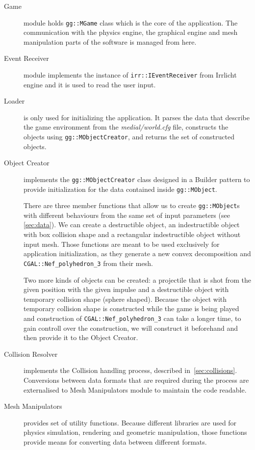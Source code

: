 \begin{description}

\item[Game] module holds {\tt gg::MGame} class which is the core of the application. The communication with the physics engine,  the graphical engine and mesh manipulation parts of the software is managed from here.

\item[Event Receiver] module implements the instance of {\tt irr::IEventReceiver} from Irrlicht engine and it is used to read the user input.

\item[Loader] is only used for initializing the application. It parses the data that describe the game environment from the \emph{medial/world.cfg} file, constructs the objects using {\tt gg::MObjectCreator}, and returns the set of constructed objects.

\item[Object Creator] implements the {\tt gg::MObjectCreator} class designed in a Builder pattern to provide initialization for the data contained inside {\tt gg::MObject}.

There are three member functions that allow us to create {\tt gg::MObject}s  with different behaviours from the same set of input parameters (see \cref{sec:data}). We can create a destructible object, an indestructible object with box collision shape and a rectangular indestructible object without input mesh.  Those functions are meant to be used exclusively for application initialization, as they generate a new convex decomposition and {\tt CGAL::Nef\_polyhedron\_3} from their mesh.

Two more kinds of objects can be created: a projectile that is shot from the given position with the given impulse and a destructible object with temporary collision shape (sphere shaped). Because the object with temporary collision shape is constructed while the game is being played and construction of {\tt CGAL::Nef\_polyhedron\_3} can take a longer time, to gain controll over the construction, we will construct it beforehand and then provide it to the Object Creator.

\item[Collision Resolver] implements the Collision handling process, described in~\cref{sec:collisions}. Conversions between data formats that are required during the process are externalised to Mesh Manipulators module to maintain the code readable.

\item[Mesh Manipulators] provides set of utility functions. Because different libraries are used for physics simulation, rendering and geometric manipulation, those functions provide means for converting data between different formats.
\end{description}

